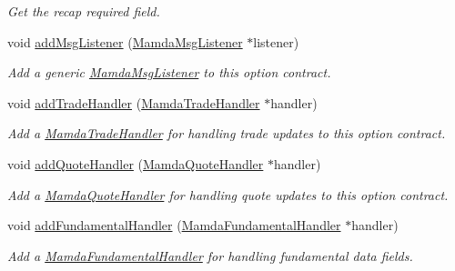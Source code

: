 \begin{CompactItemize}
\begin{CompactList}\small\item\em Get the recap required field. \item\end{CompactList}\item 
void \hyperlink{classWombat_1_1MamdaOptionContract_722a517c5fefa5847e3c4ea8a867d06a}{add\-Msg\-Listener} (\hyperlink{classWombat_1_1MamdaMsgListener}{Mamda\-Msg\-Listener} $\ast$listener)
\begin{CompactList}\small\item\em Add a generic \hyperlink{classWombat_1_1MamdaMsgListener}{Mamda\-Msg\-Listener} to this option contract. \item\end{CompactList}\item 
void \hyperlink{classWombat_1_1MamdaOptionContract_0b3314cdac09a861df9f12bc8ef5e510}{add\-Trade\-Handler} (\hyperlink{classWombat_1_1MamdaTradeHandler}{Mamda\-Trade\-Handler} $\ast$handler)
\begin{CompactList}\small\item\em Add a \hyperlink{classWombat_1_1MamdaTradeHandler}{Mamda\-Trade\-Handler} for handling trade updates to this option contract. \item\end{CompactList}\item 
void \hyperlink{classWombat_1_1MamdaOptionContract_c19937c97b686522612cd60faa52330b}{add\-Quote\-Handler} (\hyperlink{classWombat_1_1MamdaQuoteHandler}{Mamda\-Quote\-Handler} $\ast$handler)
\begin{CompactList}\small\item\em Add a \hyperlink{classWombat_1_1MamdaQuoteHandler}{Mamda\-Quote\-Handler} for handling quote updates to this option contract. \item\end{CompactList}\item 
void \hyperlink{classWombat_1_1MamdaOptionContract_f19a17c9139d85a3caa31d2f595ff3c7}{add\-Fundamental\-Handler} (\hyperlink{classWombat_1_1MamdaFundamentalHandler}{Mamda\-Fundamental\-Handler} $\ast$handler)
\begin{CompactList}\small\item\em Add a \hyperlink{classWombat_1_1MamdaFundamentalHandler}{Mamda\-Fundamental\-Handler} for handling fundamental data fields. \item\end{CompactList}\item 

\end{CompactItemize}
